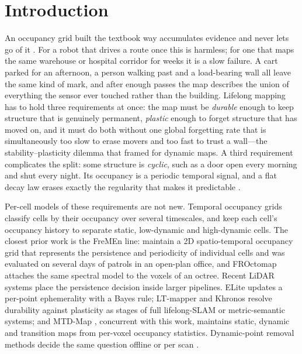 \section{Introduction}\label{sec:intro}



An occupancy grid built the textbook way accumulates evidence and never lets go of it \citep{thrun2005probabilistic}. For a robot that drives a route once this is harmless; for one that maps the same warehouse or hospital corridor for weeks it is a slow failure. A cart parked for an afternoon, a person walking past and a load-bearing wall all leave the same kind of mark, and after enough passes the map describes the union of everything the sensor ever touched rather than the building. Lifelong mapping has to hold three requirements at once: the map must be \emph{durable} enough to keep structure that is genuinely permanent, \emph{plastic} enough to forget structure that has moved on, and it must do both without one global forgetting rate that is simultaneously too slow to erase movers and too fast to trust a wall---the stability--plasticity dilemma that \citet{biber2005dynamicmaps} framed for dynamic maps. A third requirement complicates the split: some structure is \emph{cyclic}, such as a door open every morning and shut every night. Its occupancy is a periodic temporal signal, and a flat decay law erases exactly the regularity that makes it predictable \citep{krajnik2017fremen,krajnik2014spectral}.

Per-cell models of these requirements are not new. Temporal occupancy grids \citep{arbuckle2002temporal} classify cells by their occupancy over several timescales, and \citet{mitsou2007temporal} keep each cell's occupancy history to separate static, low-dynamic and high-dynamic cells. The closest prior work is the FreMEn line: \citet{krajnik2016persistent} maintain a 2D spatio-temporal occupancy grid that represents the persistence and periodicity of individual cells and was evaluated on several days of patrols in an open-plan office, and FROctomap \citep{krajnik2014froctomap} attaches the same spectral model to the voxels of an octree. Recent LiDAR systems place the persistence decision inside larger pipelines. ELite \citep{gil2025elite} updates a per-point ephemerality with a Bayes rule; LT-mapper \citep{kim2022ltmapper} and Khronos \citep{schmid2024khronos} resolve durability against plasticity as stages of full lifelong-SLAM or metric-semantic systems; and MTD-Map \citep{kim2026mtdmap}, concurrent with this work, maintains static, dynamic and transition maps from per-voxel occupancy statistics. Dynamic-point removal methods decide the same question offline or per scan \citep{kim2020removert,lim2021erasor,duberg2024dufomap,jia2024beautymap}.

